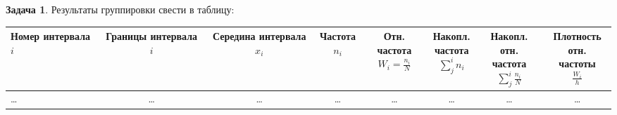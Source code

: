 \documentclass[a4paper,12pt]{article}
\theoremstyle{definition}
\newtheorem{problem}{Задача}\setlength{\parindent}{0pt}
\begin{document}
\vspace{8pt}
\begin{problem}
    Результаты группировки свести в таблицу:

    \begin{table}[H]
        \centering
        \begin{adjustbox}{max width=\textwidth}
            \begin{tabular}{l c c c c c c c}
                \toprule
                    \makecell{Номер\\интервала \( i \)} & 
                    \makecell{Границы \\ интервала \( i \)} & 
                    \makecell{Середина\\интервала \( x_i \)} & 
                    \makecell{Частота\\\( n_i \)} & 
                    \makecell{Отн. частота\\\( W_i = \frac{n_i}{N} \)} & 
                    \makecell{Накопл.\\частота\\\( \sum^i_j n_i \)} & 
                    \makecell{Накопл. отн.\\частота\\\( \sum^i_j \frac{n_i}{N} \)} & 
                    \makecell{Плотность\\отн. частоты\\\( \frac{W_i}{h} \)} \\
                        \midrule
                            \dots & \dots & \dots & \dots & \dots & \dots & \dots & \dots \\
                        \bottomrule
            \end{tabular}
        \end{adjustbox}
    \end{table}  


\end{problem}
\end{document}
